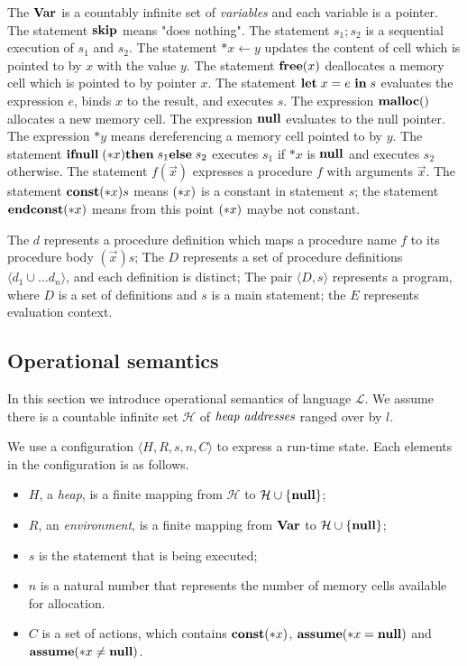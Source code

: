 The \(\mathbf{Var}\) is a countably infinite set of \emph{variables} and each
variable is a pointer. The statement \(\mathbf{skip}\) means "does nothing".
The statement \(s_1;s_2\) is a sequential execution of \(s_1\) and
\(s_2\). The statement \(*x \leftarrow y\) updates the content of cell
which is pointed to by \(x\) with the value \(y\). The statement
\(\mathbf{free}(x)\) deallocates a memory cell which is pointed to by pointer
\(x\). The statement \(\mathbf{let}\; x = e\ \mathbf{in}\; s\) evaluates the expression
\(e\), binds \(x\) to the result, and executes \(s\). The expression
\(\mathbf{malloc}()\) allocates a new memory cell. The expression \(\mathbf{null}\)
evaluates to the null pointer. The expression \(*y\) means
dereferencing a memory cell pointed to by \(y\). The statement
\(\mathbf{ifnull}\;(*x) \mathbf{then}\; s_1 \mathbf{else}\; s_2\) executes \(s_1\) if \(*x\) is
\(\mathbf{null}\) and executes \(s_2\) otherwise. The statement \(f(\vec{x})\)
expresses a procedure \(f\) with arguments \(\vec{x}\). The statement
\(\mathbf{const}(*x) s\) means \((*x)\) is a constant in statement \(s\); the
statement \(\mathbf{endconst}(*x)\) means from this point \((*x)\) maybe not
constant.

The \(d\) represents a procedure definition which maps a procedure
name \(f\) to its procedure body \((\vec{x})s\); The \(D\) represents
a set of procedure definitions \(\langle d_1 \cup\dots d_n \rangle\),
and each definition is distinct; The pair \(\langle D, s \rangle \)
represents a program, where \(D\) is a set of definitions and \(s\) is
a main statement; the \(E\) represents evaluation context.

\subsection{Operational semantics}
\label{sec:languageSemantics}
In this section we introduce operational semantics of language
\(\mathcal{L}\). We assume there is a countable infinite set
\(\mathcal{H}\) of \(\emph{heap addresses}\) ranged over by \(l\).

We use a configuration \(\langle H, R, s, n, C \rangle\) to
express a run-time state. Each elements in the configuration is as
follows.

\begin{itemize}
\item \(H\), a \emph{heap}, is a finite mapping from \(\mathcal{H}\)
  to \(\mathcal{H} \cup \{\mathbf{null}\}\);
\item \(R\), an \emph{environment}, is a finite mapping from \(\mathbf{Var}\)
  to \(\mathcal{H} \cup \{\mathbf{null}\}\);
\item \(s\) is the statement that is being executed; 
\item \(n\) is a natural number that represents the number of memory
  cells available for allocation.
\item \(C\) is a set of actions, which contains \(\mathbf{const}(*x)\),
  \(\mathbf{assume}(*x = \mathbf{null})\) and \(\mathbf{assume}(*x \ne \mathbf{null})\).
\end{itemize}

